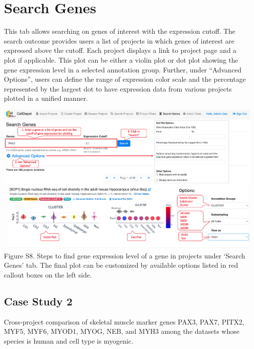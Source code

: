 \documentclass[
  openany]{book}
\begin{document}
\hypertarget{search-genes}{%
\section{Search Genes}\label{search-genes}}

This tab allows searching on genes of interest with the expression cutoff. The search outcome provides users a list of projects in which genes of interest are expressed above the cutoff. Each project displays a link to project page and a plot if applicable. This plot can be either a violin plot or dot plot showing the gene expression level in a selected annotation group. Further, under ``Advanced Options'', users can define the range of expression color scale and the percentage represented by the largest dot to have expression data from various projects plotted in a unified manner.

\href{figures/S8.jpg}{\includegraphics{figures/S8.jpg}}
Figure S8. Steps to find gene expression level of a gene in projects under `Search Genes' tab. The final plot can be customized by available options listed in red callout boxes on the left side.

\hypertarget{case-study-2}{%
\subsection{Case Study 2}\label{case-study-2}}

Cross-project comparison of skeletal muscle marker genes PAX3, PAX7, PITX2, MYF5, MYF6, MYOD1, MYOG, NEB, and MYH3 among the datasets whose species is human and cell type is myogenic.
\end{document}
